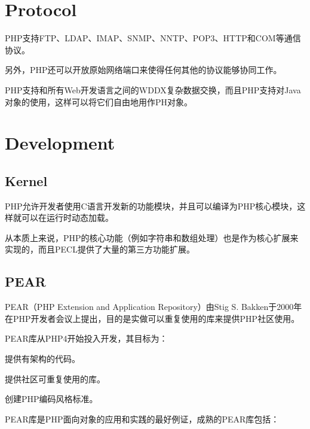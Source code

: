 \chapter{Protocol}

PHP支持FTP、LDAP、IMAP、SNMP、NNTP、POP3、HTTP和COM等通信协议。

另外，PHP还可以开放原始网络端口来使得任何其他的协议能够协同工作。

PHP支持和所有Web开发语言之间的WDDX复杂数据交换，而且PHP支持对Java对象的使用，这样可以将它们自由地用作PH对象。







\chapter{Development}

\section{Kernel}


PHP允许开发者使用C语言开发新的功能模块，并且可以编译为PHP核心模块，这样就可以在运行时动态加载。

从本质上来说，PHP的核心功能（例如字符串和数组处理）也是作为核心扩展来实现的，而且PECL提供了大量的第三方功能扩展。



\section{PEAR}


PEAR（PHP Extension and Application Repository）由Stig S. Bakken于2000年在PHP开发者会议上提出，目的是实做可以重复使用的库来提供PHP社区使用。

PEAR库从PHP4开始投入开发，其目标为：

\begin{compactitem}
\item 提供有架构的代码。
\item 提供社区可重复使用的库。
\item 创建PHP编码风格标准。
\end{compactitem}

PEAR库是PHP面向对象的应用和实践的最好例证，成熟的PEAR库包括：

